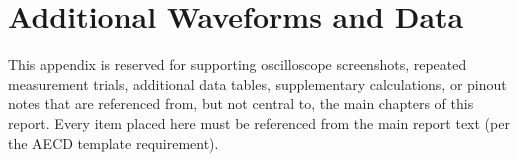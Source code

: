 \chapter{Additional Waveforms and Data}
\label{app:additional-waveforms}

This appendix is reserved for supporting oscilloscope screenshots, repeated measurement trials, additional data tables, supplementary calculations, or pinout notes that are referenced from, but not central to, the main chapters of this report. Every item placed here must be referenced from the main report text (per the AECD template requirement).

